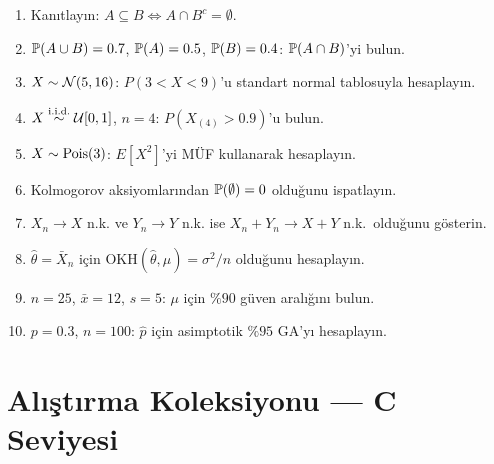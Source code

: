 \begin{enumerate}[label=\textbf{G.\arabic*.}]
  \item Kanıtlayın: $A\subseteq B\iff A\cap B^c=\emptyset$.
  \item $\mathbb{P}(A\cup B)=0.7$, $\mathbb{P}(A)=0.5$, $\mathbb{P}(B)=0.4$: $\mathbb{P}(A\cap B)$'yi bulun.
  \item $X\sim\mathcal{N}(5,16)$: $P(3<X<9)$'u standart normal tablosuyla hesaplayın.
  \item $X\overset{\text{i.i.d.}}{\sim}\mathcal{U}[0,1]$, $n=4$: $P(X_{(4)}>0.9)$'u bulun.
  \item $X\sim\operatorname{Pois}(3)$: $E[X^2]$'yi MÜF kullanarak hesaplayın.
  \item Kolmogorov aksiyomlarından $\mathbb{P}(\emptyset)=0$ olduğunu ispatlayın.
  \item $X_n\to X$ n.k. ve $Y_n\to Y$ n.k. ise $X_n+Y_n\to X+Y$ n.k.\ olduğunu gösterin.
  \item $\hat\theta=\bar X_n$ için $\mathrm{OKH}(\hat\theta,\mu)=\sigma^2/n$ olduğunu hesaplayın.
  \item $n=25$, $\bar x=12$, $s=5$: $\mu$ için $\%90$ güven aralığını bulun.
  \item $p=0.3$, $n=100$: $\hat p$ için asimptotik $\%95$ GA'yı hesaplayın.
\end{enumerate}

\section{Alıştırma Koleksiyonu --- C Seviyesi}
\label{app:C_seviye}


